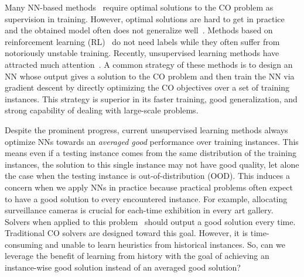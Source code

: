 Many NN-based methods~\citep{selsam2018learning,joshi2019efficient,hudson2021graph,gasse2019exact,khalil2016learning} require optimal solutions to the CO problem as supervision in training. However, optimal solutions are hard to get in practice and the obtained model often does not generalize well~\citep{yehuda2020s}. Methods based on reinforcement learning (RL)~\citep{mazyavkina2021reinforcement,bello2016neural,khalil2017learning,yolcu2019learning,chen2019learning,yao2019experimental,kwon2020pomo,kwon2021matrix,delarue2020reinforcement,nandwani2021neural} do not need labels while they often suffer from notoriously unstable training. Recently, unsupervised learning methods have attracted much attention~\citep{toenshoff2021graph,amizadeh2018learning,yao2019experimental,karalias2020erdos,wang2022unsupervised}. A common strategy of these methods is to design an NN whose output gives a solution to the CO problem and then train the NN via gradient descent by directly optimizing the CO objectives over a set of training instances. This strategy is superior in its faster training, good generalization, and strong capability of dealing with large-scale problems. %

Despite the prominent progress, current unsupervised learning methods always optimize NNs towards an \emph{averaged good} performance over training instances. This means even if a testing instance comes from the same distribution of the training instances, the solution to this single instance may not have good quality, let alone the case when the testing instance is out-of-distribution (OOD). This induces a concern when we apply NNs in practice because practical problems often expect to have a good solution to every encountered instance. For example, allocating surveillance cameras is crucial for each-time exhibition in every art gallery. Solvers when applied to this problem~\citep{o1987art,yabuta2008optimum} should output a good solution every time. Traditional CO solvers are designed toward this goal. However, it is time-consuming and unable to learn heuristics from historical instances. So, can we leverage the benefit of learning from history with the goal of achieving an instance-wise good solution instead of an averaged good solution?

